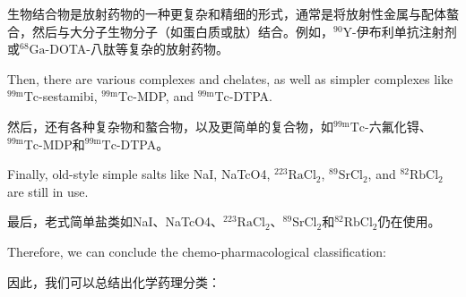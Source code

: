\documentclass[dvipsnames, svgnames,a4paper,11pt]{article}
\begin{document}
生物结合物是放射药物的一种更复杂和精细的形式，通常是将放射性金属与配体螯合，然后与大分子生物分子（如蛋白质或肽）结合。例如，${}^\text{90}\text{Y}$-伊布利单抗注射剂或${}^\text{68}\text{Ga}$-DOTA-八肽等复杂的放射药物。


Then, there are various complexes and chelates, as well as simpler complexes like ${}^\text{99m}\text{Tc}$-sestamibi, ${}^\text{99m}\text{Tc}$-MDP, and ${}^\text{99m}\text{Tc}$-DTPA.

然后，还有各种复杂物和螯合物，以及更简单的复合物，如${}^\text{99m}\text{Tc}$-六氟化锝、${}^\text{99m}\text{Tc}$-MDP和${}^\text{99m}\text{Tc}$-DTPA。

Finally, old-style simple salts like NaI, NaTcO4, ${}^\text{223}\text{RaCl}_2$, ${}^\text{89}\text{SrCl}_2$, and ${}^\text{82}\text{RbCl}_2$ are still in use.

最后，老式简单盐类如NaI、NaTcO4、${}^\text{223}\text{RaCl}_2$、${}^\text{89}\text{SrCl}_2$和${}^\text{82}\text{RbCl}_2$仍在使用。

Therefore, we can conclude the chemo-pharmacological classification:

因此，我们可以总结出化学药理分类：
\end{document}
